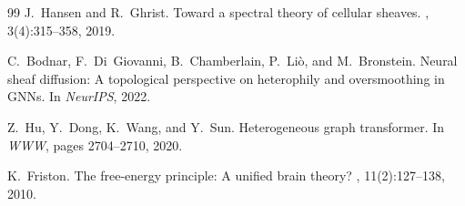 \documentclass[11pt]{article}
\begin{document}
\begin{thebibliography}{99}
J.~Hansen and R.~Ghrist.
\newblock Toward a spectral theory of cellular sheaves.
, 3(4):315--358, 2019.

C.~Bodnar, F.~Di~Giovanni, B.~Chamberlain, P.~Li\`{o}, and M.~Bronstein.
\newblock Neural sheaf diffusion: A topological perspective on heterophily and oversmoothing in GNNs.
\newblock In {\em NeurIPS}, 2022.

Z.~Hu, Y.~Dong, K.~Wang, and Y.~Sun.
\newblock Heterogeneous graph transformer.
\newblock In {\em WWW}, pages 2704--2710, 2020.

K.~Friston.
\newblock The free-energy principle: A unified brain theory?
, 11(2):127--138, 2010.

\end{thebibliography}
\end{document}
